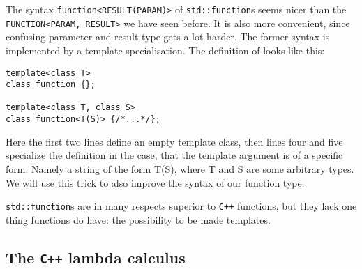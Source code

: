 \documentclass{article}
\newcommand{\cc}{\texttt{C++}\xspace}
\newcommand{\ir}[1]{\texttt{#1}}
\newcommand{\code}[1]{\texttt{#1}}
\begin{document}
The syntax \code{function<RESULT(PARAM)>} of \code{std::function}s seems nicer than the \ir{FUNCTION<PARAM, RESULT>} we have seen before. It is also more convenient, since confusing parameter and result type gets a lot harder. The former syntax is implemented by a template specialisation. The definition of looks like this:
\begin{lstlisting}
template<class T>
class function {};

template<class T, class S>
class function<T(S)> {/*...*/};
\end{lstlisting}
Here the first two lines define an empty template class, then lines four and five specialize the definition in the case, that the template argument is of a specific form. Namely a string of the form T(S), where T and S are some arbitrary types. We will use this trick to also improve the syntax of our function type.

\code{std::function}s are in many respects superior to \cc functions, but they lack one thing functions do have: the possibility to be made templates.


\subsection{The \cc lambda calculus}\label{sec: The cc lambda calculus}
\end{document}
